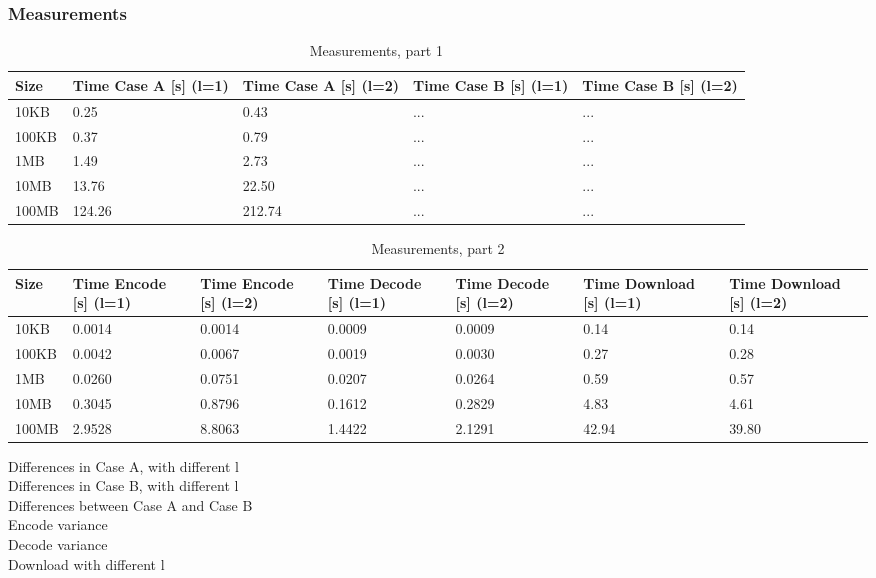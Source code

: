 \subsubsection*{Measurements}
\begin{table}[H]
    \begin{tabularx}{\textwidth}{|X|X|X|X|X|}
        \hline
        \cellcolor{lightgray}\textbf{Size} & \cellcolor{lightgray}\textbf{Time Case A [s] (l=1)} & \cellcolor{lightgray}\textbf{Time Case A [s] (l=2)} & \cellcolor{lightgray}\textbf{Time Case B [s] (l=1)} & \cellcolor{lightgray}\textbf{Time Case B [s] (l=2)} \\\hline
        10KB  & 0.25   & 0.43   & ... & ... \\\hline
        100KB & 0.37   & 0.79   & ... & ... \\\hline
        1MB   & 1.49   & 2.73   & ... & ... \\\hline
        10MB  & 13.76  & 22.50  & ... & ... \\\hline
        100MB & 124.26 & 212.74 & ... & ... \\\hline
    \end{tabularx}
    \caption{Measurements, part 1}
	\label{tab:e3meas1}
\end{table}

\begin{table}[H]
    \begin{tabularx}{\textwidth}{|X|X|X|X|X|X|X|}
        \hline
        \cellcolor{lightgray}\textbf{Size} & \cellcolor{lightgray}\textbf{Time Encode [s] (l=1)} & \cellcolor{lightgray}\textbf{Time Encode [s] (l=2)} & \cellcolor{lightgray}\textbf{Time Decode [s] (l=1)} & \cellcolor{lightgray}\textbf{Time Decode [s] (l=2)} & \cellcolor{lightgray}\textbf{Time Download [s] (l=1)} & \cellcolor{lightgray}\textbf{Time Download [s] (l=2)} \\\hline
        10KB  & 0.0014 & 0.0014 & 0.0009 & 0.0009 & 0.14  & 0.14  \\\hline
        100KB & 0.0042 & 0.0067 & 0.0019 & 0.0030 & 0.27  & 0.28  \\\hline
        1MB   & 0.0260 & 0.0751 & 0.0207 & 0.0264 & 0.59  & 0.57  \\\hline
        10MB  & 0.3045 & 0.8796 & 0.1612 & 0.2829 & 4.83  & 4.61  \\\hline
        100MB & 2.9528 & 8.8063 & 1.4422 & 2.1291 & 42.94 & 39.80 \\\hline
    \end{tabularx}
    \caption{Measurements, part 2}
	\label{tab:e3meas2}
\end{table}

Differences in Case A, with different l \\
Differences in Case B, with different l \\
Differences between Case A and Case B \\
Encode variance \\
Decode variance \\
Download with different l
